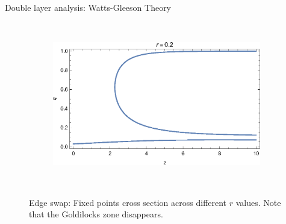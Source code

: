 \documentclass[10pt, xcolor=dvipsnames]{beamer}
\begin{document}
\begin{frame}{Double layer analysis: Watts-Gleeson Theory}
\begin{figure}
\begin{subfigure}[b]{0.4\textwidth}
    \end{subfigure}
    ~ %
    \begin{subfigure}[b]{0.4\textwidth}
        \includegraphics[width=\textwidth]{figures/two_layer_edge_qz_r02}
    \end{subfigure}
    ~
    \caption{Edge swap: Fixed points cross section across different $r$ values. Note that the Goldilocks zone disappears. }
\end{figure}
\end{frame}
\end{document}
